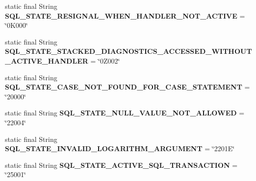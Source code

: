 \begin{DoxyCompactItemize}
\item 
\mbox{\label{classcom_1_1mysql_1_1jdbc_1_1_s_q_l_error_a17fb6f4a18b90cda2bdc3b4b9587fb90}} 
static final String {\bfseries S\+Q\+L\+\_\+\+S\+T\+A\+T\+E\+\_\+\+R\+E\+S\+I\+G\+N\+A\+L\+\_\+\+W\+H\+E\+N\+\_\+\+H\+A\+N\+D\+L\+E\+R\+\_\+\+N\+O\+T\+\_\+\+A\+C\+T\+I\+VE} = \char`\"{}0\+K000\char`\"{}
\item 
\mbox{\label{classcom_1_1mysql_1_1jdbc_1_1_s_q_l_error_a11f7025079f28ecb7fe761ecf605e2ea}} 
static final String {\bfseries S\+Q\+L\+\_\+\+S\+T\+A\+T\+E\+\_\+\+S\+T\+A\+C\+K\+E\+D\+\_\+\+D\+I\+A\+G\+N\+O\+S\+T\+I\+C\+S\+\_\+\+A\+C\+C\+E\+S\+S\+E\+D\+\_\+\+W\+I\+T\+H\+O\+U\+T\+\_\+\+A\+C\+T\+I\+V\+E\+\_\+\+H\+A\+N\+D\+L\+ER} = \char`\"{}0\+Z002\char`\"{}
\item 
\mbox{\label{classcom_1_1mysql_1_1jdbc_1_1_s_q_l_error_a34499bce4a07591b776df6b9d01115c8}} 
static final String {\bfseries S\+Q\+L\+\_\+\+S\+T\+A\+T\+E\+\_\+\+C\+A\+S\+E\+\_\+\+N\+O\+T\+\_\+\+F\+O\+U\+N\+D\+\_\+\+F\+O\+R\+\_\+\+C\+A\+S\+E\+\_\+\+S\+T\+A\+T\+E\+M\+E\+NT} = \char`\"{}20000\char`\"{}
\item 
\mbox{\label{classcom_1_1mysql_1_1jdbc_1_1_s_q_l_error_af01bae5655cc3be8d5ff8d1ccf7c8087}} 
static final String {\bfseries S\+Q\+L\+\_\+\+S\+T\+A\+T\+E\+\_\+\+N\+U\+L\+L\+\_\+\+V\+A\+L\+U\+E\+\_\+\+N\+O\+T\+\_\+\+A\+L\+L\+O\+W\+ED} = \char`\"{}22004\char`\"{}
\item 
\mbox{\label{classcom_1_1mysql_1_1jdbc_1_1_s_q_l_error_a96aee49e17cd6fe973ae392f805317f0}} 
static final String {\bfseries S\+Q\+L\+\_\+\+S\+T\+A\+T\+E\+\_\+\+I\+N\+V\+A\+L\+I\+D\+\_\+\+L\+O\+G\+A\+R\+I\+T\+H\+M\+\_\+\+A\+R\+G\+U\+M\+E\+NT} = \char`\"{}2201\+E\char`\"{}
\item 
\mbox{\label{classcom_1_1mysql_1_1jdbc_1_1_s_q_l_error_ad55351be45ebcd041d4422bdfbb18da7}} 
static final String {\bfseries S\+Q\+L\+\_\+\+S\+T\+A\+T\+E\+\_\+\+A\+C\+T\+I\+V\+E\+\_\+\+S\+Q\+L\+\_\+\+T\+R\+A\+N\+S\+A\+C\+T\+I\+ON} = \char`\"{}25001\char`\"{}
\item 

\end{DoxyCompactItemize}
